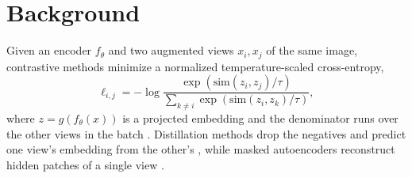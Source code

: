 \chapter{Background}
\label{ch:background}

Given an encoder $f_\theta$ and two augmented views $x_i, x_j$ of the same image, contrastive
methods minimize a normalized temperature-scaled cross-entropy,
\begin{equation}
  \ell_{i,j} = -\log \frac{\exp(\mathrm{sim}(z_i, z_j)/\tau)}
  {\sum_{k \neq i} \exp(\mathrm{sim}(z_i, z_k)/\tau)},
  \label{eq:nce}
\end{equation}
where $z = g(f_\theta(x))$ is a projected embedding and the denominator runs over the other
views in the batch \citep{chen2020simclr}. Distillation methods drop the negatives and predict
one view's embedding from the other's \citep{grill2020byol}, while masked autoencoders
reconstruct hidden patches of a single view \citep{he2022mae}.
